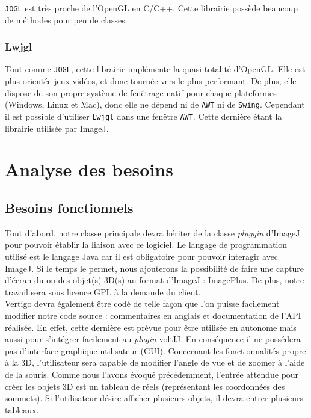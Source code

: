 \documentclass[11pt]{report}
\begin{document}
\texttt{JOGL} est très proche de l'OpenGL en C/C++. Cette librairie possède beaucoup de méthodes pour peu de classes.


\subsection{Lwjgl}
Tout comme \texttt{JOGL}, cette librairie implémente la quasi totalité d'OpenGL. Elle est plus orientée jeux vidéos, et donc tournée vers le plus performant. De plus, elle dispose de son propre système de fenêtrage natif pour chaque plateformes (Windows, Linux et Mac), donc elle ne dépend ni de \texttt{AWT} ni de \texttt{Swing}. 
Cependant il est possible d'utiliser \texttt{Lwjgl} dans une fenêtre \texttt{AWT}.
Cette dernière étant la librairie utilisée par ImageJ.

\chapter{Analyse des besoins}

\section{Besoins fonctionnels}
Tout d'abord, notre classe principale devra hériter de la classe \textit{pluggin} d'ImageJ pour pouvoir établir la liaison avec ce logiciel.
Le langage de programmation utilisé est le langage Java car il est obligatoire pour pouvoir interagir avec ImageJ. Si le temps le permet, nous ajouterons la possibilité de faire une capture d'écran du ou des objet(s) 3D(s) au format d'ImageJ : ImagePlus.
De plus, notre travail sera sous licence GPL à la demande du client.\\

Vertigo devra également être codé de telle façon que l'on puisse facilement modifier notre code source : commentaires en anglais et documentation de l'API réalisée. En effet, cette dernière est prévue pour être utilisée en autonome mais aussi pour s'intégrer facilement au \textit{plugin} voltIJ. En conséquence il ne possédera pas d'interface graphique utilisateur (GUI).
Concernant les fonctionnalités propre à la 3D, l'utilisateur sera capable de modifier l'angle de vue et de zoomer  à l'aide de la souris.
Comme nous l'avons évoqué précédemment, l'entrée attendue pour créer les objets 3D est un tableau de réels (représentant les coordonnées des sommets). Si l'utilisateur désire afficher plusieurs objets, il devra entrer plusieurs tableaux.\\
\end{document}
